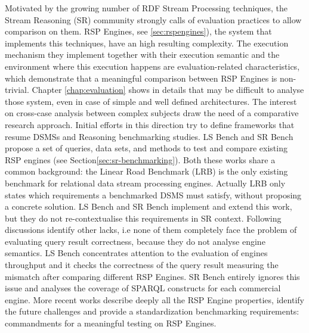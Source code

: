 Motivated by the growing number of RDF Stream Processing techniques, the Stream Reasoning (SR) community strongly calls of evaluation practices to allow comparison on them. RSP Engines, see \ref{sec:rspengines}), the system that implements this techniques, have an high resulting complexity. The execution mechanism they implement together with their execution semantic and the environment where this execution happens are evaluation-related characteristics, which demonstrate that a meaningful comparison between RSP Engines is non-trivial. Chapter 	\ref{chap:evaluation} shows in details that may be difficult to analyse those system, even in case of simple and well defined architectures. 
The interest on cross-case analysis between complex subjects draw the need of a comparative research approach. Initial efforts in this direction try to define frameworks that resume  DSMSs \cite{arasu2004linear} and Reasoning \cite{Guo2005} benchmarking studies. LS Bench and SR Bench propose a set of queries, data sets, and methods to test and compare existing RSP engines (see Section\ref{sec:sr-benchmarking}). Both these works share a common background: the Linear Road Benchmark (LRB) is the only existing benchmark for relational data stream processing engines. Actually LRB only states which requirements a benchmarked DSMS must satisfy, without proposing a concrete solution. LS Bench and SR Bench implement and extend this work, but they do not re-contextualise this requirements in SR context. Following discussions identify other lacks, i.e none of them completely face the problem of evaluating query result correctness, because they do not analyse engine semantics. LS Bench concentrates attention to the evaluation of engines throughput and it checks the correctness of the query result measuring the mismatch after comparing different RSP Engines. SR Bench entirely ignores this issue and analyses the coverage of SPARQL constructs for each commercial engine. More recent works describe deeply all the RSP Engine properties, identify the future challenges and provide a standardization benchmarking requirements: commandments for a meaningful testing on RSP Engines\cite{DBLP:conf/esws/ScharrenbachUMVB13}.

